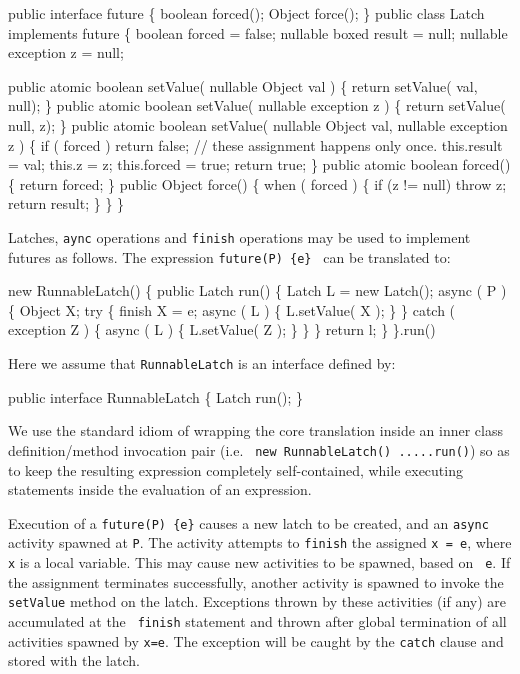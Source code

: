 {{\begin{x10}
public interface future \{
   boolean forced();
   Object force();
\}
public class Latch implements future \{
  boolean forced = false;
  nullable boxed result = null;
  nullable exception z = null;

  public atomic 
   boolean setValue( nullable Object val ) \{
   return setValue( val, null);
    \}
   public atomic 
   boolean setValue( nullable exception z ) \{
        return setValue( null, z);
    \}
    public atomic 
    boolean setValue( nullable Object val, 
                      nullable exception z ) \{
        if ( forced ) return false;
        // these assignment happens only once.
        this.result = val;
        this.z = z;
        this.forced = true;
        return true;
    \}
    public atomic boolean forced() \{
        return forced;
    \}
    public Object force() \{
        when ( forced ) \{
            if (z != null) throw z;
            return result;
        \}
    \}
\}
\end{x10}

Latches, {\tt aync} operations and {\tt finish} operations may be used
to implement futures as follows. The expression {\tt future(P) \{e\} }
can be translated to:
\begin{x10}
  new RunnableLatch() \{
      public Latch run() \{
         Latch L = new Latch();
         async ( P ) \{
            Object X;
            try \{
                finish X = e;
                async ( L ) \{
                   L.setValue( X ); 
                \}
            \} catch ( exception Z ) \{
               async ( L ) \{
                 L.setValue( Z );
               \}
            \}
         \}
         return l;
      \}
    \}.run()
\end{x10}

Here we assume that {\tt RunnableLatch} is an interface defined by:
\begin{x10} 
  public interface RunnableLatch \{
     Latch run();
  \}
\end{x10}

We use the standard \java{} idiom of wrapping the core translation
inside an inner class definition/method invocation pair (i.e.{} {\tt
new RunnableLatch() {....}.run()}) so as to keep the resulting
expression completely self-contained, while executing statements
inside the evaluation of an expression.

Execution of a {\tt future(P) \{e\}} causes a new latch to be created,
and an {\tt async} activity spawned at {\tt P}. The activity attempts
to {\tt finish} the assigned {\tt x = e}, where {\tt x} is a local
variable.  This may cause new activities to be spawned, based on {\tt
e}. If the assignment terminates successfully, another activity is
spawned to invoke the {\tt setValue} method on the latch.  Exceptions
thrown by these activities (if any) are accumulated at the {\tt
finish} statement and thrown after global termination of all
activities spawned by {\tt x=e}. The exception will be caught by the 
{\tt catch} clause and stored with the latch. 


}}
